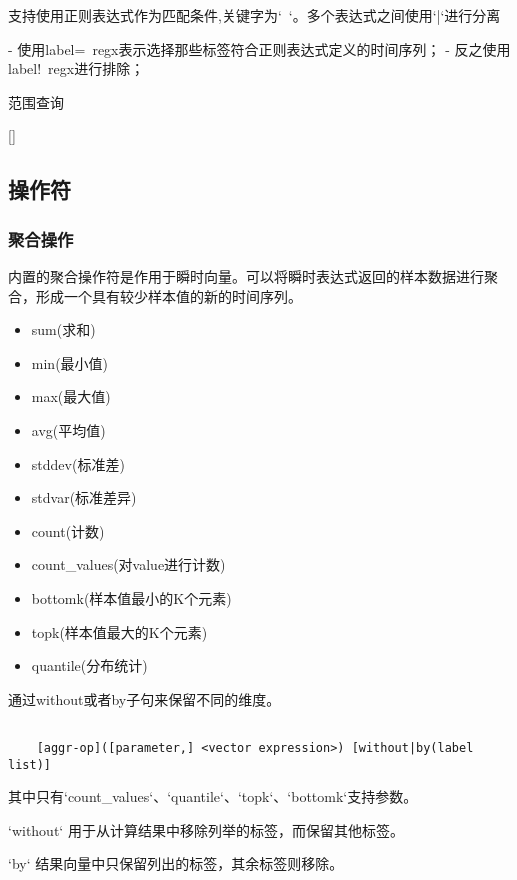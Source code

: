 支持使用正则表达式作为匹配条件,关键字为`~`。多个表达式之间使用`|`进行分离

    - 使用label=~regx表示选择那些标签符合正则表达式定义的时间序列；
    - 反之使用label!~regx进行排除；


范围查询

[]


\subsection{操作符}



\subsubsection{聚合操作}

内置的聚合操作符是作用于瞬时向量。可以将瞬时表达式返回的样本数据进行聚合，形成一个具有较少样本值的新的时间序列。

\begin{itemize}
    \item sum(求和)
    \item  min(最小值)
    \item  max(最大值)
    \item  avg(平均值)
    \item  stddev(标准差)
    \item  stdvar(标准差异)
    \item  count(计数)
    \item  count_values(对value进行计数)
    \item  bottomk(样本值最小的K个元素)
    \item  topk(样本值最大的K个元素)
    \item  quantile(分布统计)
\end{itemize}

通过without或者by子句来保留不同的维度。

\begin{lstlisting}[language=shell]

    [aggr-op]([parameter,] <vector expression>) [without|by(label list)]

\end{lstlisting}

其中只有`count_values`、`quantile`、`topk`、`bottomk`支持参数。

`without` 用于从计算结果中移除列举的标签，而保留其他标签。

`by` 结果向量中只保留列出的标签，其余标签则移除。







